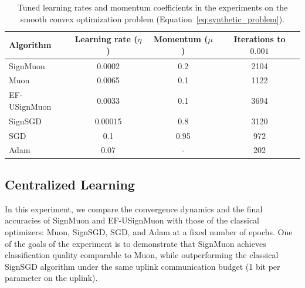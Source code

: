 \documentclass{article}
\begin{document}
\begin{table}[H]
\centering
\caption{Tuned learning rates and momentum coefficients in the experiments on the smooth convex optimization problem (Equation~\ref{eq:synthetic_problem}).}
\label{tab:synthetic_results}
\small
\renewcommand{\arraystretch}{1.2}
\begin{tabular}{|l|c|c|c|}
\hline
\textbf{Algorithm} & \textbf{Learning rate ($\eta$)} & \textbf{Momentum ($\mu$)} & \textbf{Iterations to $0.001$} \\
\hline
SignMuon & 0.0002 & 0.2 & 2104 \\
Muon & 0.0065 & 0.1 & 1122 \\
EF-USignMuon & 0.0033 & 0.1 & 3694 \\
SignSGD & 0.00015 & 0.8 & 3120 \\
SGD & 0.1 & 0.95 & 972 \\
Adam &  0.07 & - & 202 \\
\hline
\end{tabular}
\end{table}


\subsection{Centralized Learning}
In this experiment, we compare the convergence dynamics and the final accuracies of SignMuon and EF-USignMuon with those of the classical optimizers: Muon, SignSGD, SGD, and Adam at a fixed number of epochs. One of the goals of the experiment is to demonstrate that SignMuon achieves classification quality comparable to Muon, while outperforming the classical SignSGD algorithm under the same uplink communication budget (1 bit per parameter on the uplink).
\end{document}
